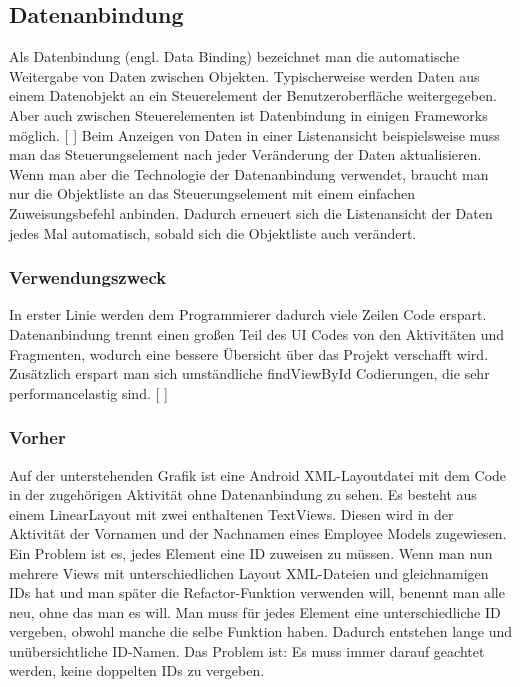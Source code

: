 \documentclass[FIPLY_base.tex]{subfiles}
\begin{document}
\subsection{Datenanbindung}
Als Datenbindung (engl. Data Binding) bezeichnet man die automatische Weitergabe von Daten zwischen Objekten. Typischerweise werden Daten aus einem Datenobjekt an ein Steuerelement der Benutzeroberfläche weitergegeben. Aber auch zwischen Steuerelementen ist Datenbindung in einigen Frameworks möglich. [ \cite{datbdef}]
\newline
Beim Anzeigen von Daten in einer Listenansicht beispielsweise muss man das Steuerungselement nach jeder Veränderung der Daten aktualisieren. Wenn man aber die Technologie der Datenanbindung verwendet, braucht man nur die Objektliste an das Steuerungselement mit einem einfachen Zuweisungsbefehl anbinden. Dadurch erneuert sich die Listenansicht der Daten jedes Mal automatisch, sobald sich die Objektliste auch verändert.


\subsubsection{Verwendungszweck}
In erster Linie werden dem Programmierer dadurch viele Zeilen Code erspart. Datenanbindung trennt einen großen Teil des UI Codes von den Aktivitäten und Fragmenten, wodurch eine bessere Übersicht über das Projekt verschafft wird. Zusätzlich erspart man sich umständliche findViewById Codierungen, die sehr performancelastig sind. [ \cite{datbusing}]


\subsubsection{Vorher}

Auf der unterstehenden Grafik ist eine Android XML-Layoutdatei mit dem Code in der zugehörigen Aktivität ohne Datenanbindung zu sehen. Es besteht aus einem LinearLayout mit zwei enthaltenen TextViews. Diesen wird in der Aktivität der Vornamen und der Nachnamen eines Employee Models zugewiesen. Ein Problem ist es, jedes Element eine ID zuweisen zu müssen. Wenn man nun mehrere Views mit unterschiedlichen Layout XML-Dateien und gleichnamigen IDs hat und man später die Refactor-Funktion verwenden will, benennt man alle neu, ohne das man es will. Man muss für jedes Element eine unterschiedliche ID vergeben, obwohl manche die selbe Funktion haben. Dadurch entstehen lange und unübersichtliche ID-Namen. Das Problem ist: Es muss immer darauf geachtet werden, keine doppelten IDs zu vergeben.\\
\end{document}
